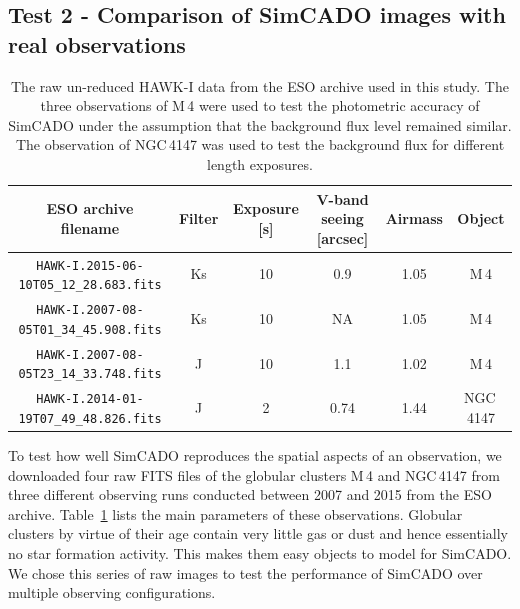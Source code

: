 \subsection{Test 2 - Comparison of SimCADO images with real observations}
\label{subsec:HAWKI_comparison}

\begin{table}

    \centering
    \caption{The raw un-reduced HAWK-I data from the ESO archive used in this study. The three observations of M\,4 were used to test the photometric accuracy of SimCADO under the assumption that the background flux level remained similar. The observation of NGC\,4147 was used to test the background flux for different length exposures.}
    \label{tab:HAWKI_raw}
    \begin{tabular}{c c c c c c }
        \hline\hline
        ESO archive filename                        & Filter & Exposure [s] & V-band seeing [arcsec]    &  Airmass  & Object  \\
        \hline
        \verb+HAWK-I.2015-06-10T05_12_28.683.fits+   & Ks     &  10          &  0.9                      &  1.05     & M\,4    \\
        \verb+HAWK-I.2007-08-05T01_34_45.908.fits+   & Ks     &  10          &  NA                       &  1.05     & M\,4    \\
        \verb+HAWK-I.2007-08-05T23_14_33.748.fits+   & J      &  10          &  1.1                      &  1.02     & M\,4    \\
        \hline
        \verb+HAWK-I.2014-01-19T07_49_48.826.fits+   & J      &  2           &  0.74                     &  1.44     & NGC\,4147    \\
        \hline
    \end{tabular}
    
\end{table}


To test how well SimCADO reproduces the spatial aspects of an observation, we downloaded four raw FITS files of the globular clusters M\,4 and NGC\,4147 from three different observing runs conducted between 2007 and 2015 from the ESO archive. Table~\ref{tab:HAWKI_raw} lists the main parameters of these observations. Globular clusters by virtue of their age contain very little gas or dust and hence essentially no star formation activity. This makes them easy objects to model for SimCADO. We chose this series of raw images to test the performance of SimCADO over multiple observing configurations. 

